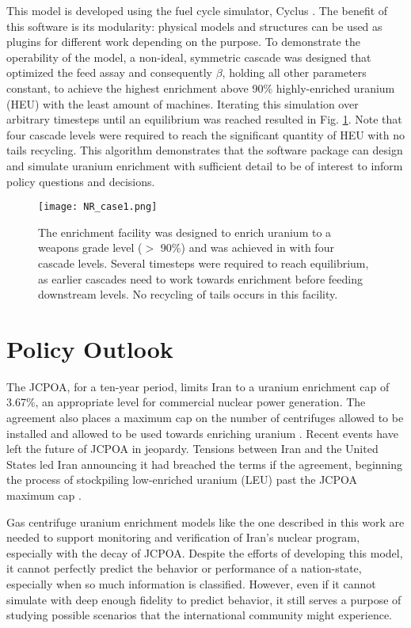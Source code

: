 \documentclass{article}
\begin{document}
This model is developed using the fuel cycle simulator, Cyclus \cite{cyclus}. The benefit of this software is its modularity: physical models and structures can be used as plugins for different work depending on the purpose. To demonstrate the operability of the model, a non-ideal, symmetric cascade was designed that optimized the feed assay and consequently $\beta$, holding all other parameters constant, to achieve the highest enrichment above 90\% highly-enriched uranium (HEU) with the least amount of machines. Iterating this simulation over arbitrary timesteps until an equilibrium was reached resulted in Fig. \ref{fig:enrichment}. Note that four cascade levels were required to reach the significant quantity of HEU with no tails recycling. This algorithm demonstrates that the software package can design and simulate uranium enrichment with sufficient detail to be of interest to inform policy questions and decisions.

\begin{figure}[t!]
    \centering
    \texttt{[image: NR\_case1.png]}
    \caption{The enrichment facility was designed to enrich uranium to a weapons grade level ($>$ 90\%) and was achieved in with four cascade levels. Several timesteps were required to reach equilibrium, as earlier cascades need to work towards enrichment before feeding downstream levels. No recycling of tails occurs in this facility.}
    \label{fig:enrichment}
\end{figure}

\section{Policy Outlook}

The JCPOA, for a ten-year period, limits Iran to a uranium enrichment cap of 3.67\%, an appropriate level for commercial nuclear power generation. The agreement also places a maximum cap on the number of centrifuges allowed to be installed and allowed to be used towards enriching uranium \cite{jcpoa}. Recent events have left the future of JCPOA in jeopardy. Tensions between Iran and the United States led Iran announcing it had breached the terms if the agreement, beginning the process of stockpiling low-enriched uranium (LEU) past the JCPOA maximum cap \cite{ap_news}.

Gas centrifuge uranium enrichment models like the one described in this work are needed to support monitoring and verification of Iran’s nuclear program, especially with the decay of JCPOA. Despite the efforts of developing this model, it cannot perfectly predict the behavior or performance of a nation-state, especially when so much information is classified. However, even if it cannot simulate with deep enough fidelity to predict behavior, it still serves a purpose of studying possible scenarios that the international community might experience.
\end{document}
